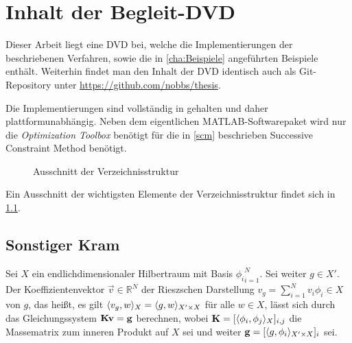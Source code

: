 \documentclass[../main.tex]{subfiles}
\begin{document}
\chapter{Inhalt der Begleit-DVD} %
\label{cha:inhalt_der_begleit_dvd}

Dieser Arbeit liegt eine DVD bei, welche die Implementierungen der beschriebenen Verfahren, sowie die in \cref{cha:Beispiele} angeführten Beispiele enthält.
Weiterhin findet man den Inhalt der DVD identisch auch als Git-Repository unter \url{https://github.com/nobbs/thesis}.

Die Implementierungen sind vollständig in \textcite{Matlab} gehalten und daher plattformunabhängig.
Neben dem eigentlichen MATLAB-Softwarepaket wird nur die \emph{Optimization Toolbox} benötigt für die in \cref{scm} beschrieben Successive Constraint Method benötigt.

\begin{figure}[tb]
    \caption{Ausschnitt der Verzeichnisstruktur}
    \label{fig:dvd}
\end{figure}

Ein Ausschnitt der wichtigsten Elemente der Verzeichnisstruktur findet sich in \cref{fig:dvd}.

\section{Sonstiger Kram} %
\label{sec:sonstiger_kram}


\begin{Lemma}
\label{lemma:berechnung_rieszsche_darstellung}
    Sei $X$ ein endlichdimensionaler Hilbertraum mit Basis ${\phi_i}_{i=1}^{N}$.
    Sei weiter $g \in X'$.
    Der Koeffizientenvektor $\vec{v} \in \mathbb{R}^{N}$ der Rieszschen Darstellung $v_g = \sum_{i=1}^{N} v_{i} \phi_{i} \in X$ von $g$, das heißt, es gilt $\langle v_g,w\rangle_{X} = \langle g,w\rangle_{X' \times X}$ für alle $w \in X$, lässt sich durch das Gleichungssystem $\mathbf{K}\mathbf{v} = \mathbf{g}$ berechnen, wobei $\mathbf{K} = [\langle\phi_{i},\phi_{j}\rangle_{X}]_{i,j}$ die Massematrix zum inneren Produkt auf $X$ sei und weiter $\mathbf{g} = [\langle g,\phi_{i}\rangle_{X' \times X}]_{i}$ sei.
\end{Lemma}

\end{document}
